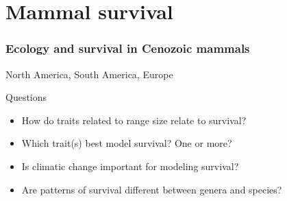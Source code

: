 \documentclass{beamer}
\begin{document}
\section{Mammal survival}

\begin{frame}
  \frametitle{Ecology and survival in Cenozoic mammals}

  \begin{center}
    North America, South America, Europe
  \end{center}

  \vspace{0.75cm}

  \begin{block}{Questions}
    \begin{itemize}
      \item How do traits related to range size relate to survival?
      \item Which trait(s) best model survival? One or more?
      \item Is climatic change important for modeling survival?
      \item Are patterns of survival different between genera and species?
    \end{itemize}
  \end{block}
  
\end{frame}
\end{document}
